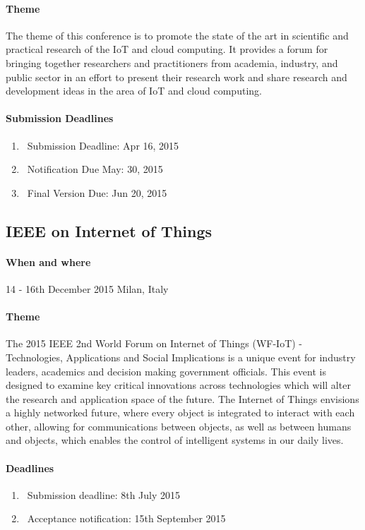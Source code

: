 \documentclass[12pt]{article}
\begin{document}
\paragraph {Theme} The theme of this conference is to promote the state of the art in scientific and practical research of the IoT and cloud computing. It provides a forum for bringing together researchers and practitioners from academia, industry, and public sector in an effort to present their research work and share research and development ideas in the area of IoT and cloud computing. 
\paragraph {Submission Deadlines} 
\begin{enumerate}

\item\ Submission Deadline:	Apr 16, 2015
\item\ Notification Due	May: 30, 2015
\item\ Final Version Due: Jun 20, 2015
\end{enumerate}
\subsection{IEEE on Internet of Things} 
\paragraph {When and where} 14 - 16th December 2015 Milan, Italy
\paragraph {Theme} The 2015 IEEE 2nd World Forum on Internet of Things (WF-IoT) - Technologies, Applications and Social Implications is a unique event for industry leaders, academics and decision making government officials. This event is designed to examine key critical innovations across technologies which will alter the research and application space of the future. The Internet of Things envisions a highly networked future, where every object is integrated to interact with each other, allowing for communications between objects, as well as between humans and objects, which enables the control of intelligent systems in our daily lives.
\paragraph {Deadlines}
\begin{enumerate}
\item\ Submission deadline: 8th July 2015
\item\ Acceptance notification: 15th September 2015

\end{enumerate}
\end{document}
